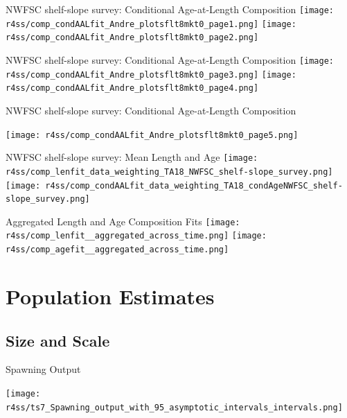 \documentclass[pdf]{beamer}\usepackage[]{graphicx}\usepackage[]{color}
\begin{document}
\begin{frame}{NWFSC shelf-slope survey: Conditional Age-at-Length Composition}
  \texttt{[image: r4ss/comp\_condAALfit\_Andre\_plotsflt8mkt0\_page1.png]}
  \texttt{[image: r4ss/comp\_condAALfit\_Andre\_plotsflt8mkt0\_page2.png]}
\end{frame}

\begin{frame}{NWFSC shelf-slope survey: Conditional Age-at-Length Composition}
  \texttt{[image: r4ss/comp\_condAALfit\_Andre\_plotsflt8mkt0\_page3.png]}
  \texttt{[image: r4ss/comp\_condAALfit\_Andre\_plotsflt8mkt0\_page4.png]}
\end{frame}

\begin{frame}{NWFSC shelf-slope survey: Conditional Age-at-Length Composition}
  \begin{center}
  \texttt{[image: r4ss/comp\_condAALfit\_Andre\_plotsflt8mkt0\_page5.png]}
  \end{center}
\end{frame}

\begin{frame}{NWFSC shelf-slope survey: Mean Length and Age}
  \texttt{[image: r4ss/comp\_lenfit\_data\_weighting\_TA18\_NWFSC\_shelf-slope\_survey.png]}
  \texttt{[image: r4ss/comp\_condAALfit\_data\_weighting\_TA18\_condAgeNWFSC\_shelf-slope\_survey.png]}
\end{frame}

\begin{frame}{Aggregated Length and Age Composition Fits}
  \texttt{[image: r4ss/comp\_lenfit\_\_aggregated\_across\_time.png]}
  \texttt{[image: r4ss/comp\_agefit\_\_aggregated\_across\_time.png]}
\end{frame}

\section{Population Estimates}
\subsection{Size and Scale}
\begin{frame}{Spawning Output}
  \begin{center}
    \texttt{[image: r4ss/ts7\_Spawning\_output\_with\_95\_asymptotic\_intervals\_intervals.png]}
  \end{center}
\end{frame}
\end{document}
